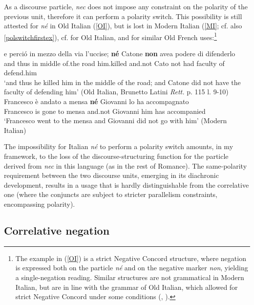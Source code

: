 \documentclass[output=paper,modfonts,nonflat,citecolor=brown,
showindex
]{langsci/langscibook}
\begin{document}
\noindent As a discourse particle, {\emph{nec}} does not impose any constraint on the polarity of the previous unit, therefore it can perform a polarity switch. This possibility is still attested for {\emph{n\'e}} in Old Italian (\ref{OI}), but is lost in Modern Italian (\ref{MI}; cf. also \ref{polswitchfirstex}), cf. \citet{Zanuttini10} for Old Italian, and \citet[]{Doetjes05} for similar Old French uses:{\footnote{The example in (\ref{OI}) is a strict Negative Concord structure, where negation is expressed both on the particle {\emph{n\'e}} and on the negative marker {\emph{non}}, yielding a single-negation reading. Similar structures are not grammatical in Modern Italian, but are in line with the grammar of Old Italian, which allowed for strict Negative Concord under some conditions (\citealt[]{Garzonio18}, \citealt[chapter 5]{Gianollo18}).}} 

{\begin{exe}
\ex
\begin{xlist}
\ex \label{OI} \gll e perci\'o in mezzo della via l'uccise; {\textbf{n\'e}} Catone {\textbf{non}} avea podere di difenderlo\\
and thus in middle of.the road him.killed and.not Cato not had faculty of defend.him\\

`and thus he killed him in the middle of the road; and Catone did not have the faculty of defending him' (Old Italian, Brunetto Latini {\emph{Rett.}} p. 115 l. 9-10) 
\ex \label{MI} \gll *Francesco \`e andato a mensa {\textbf{n\'e}} Giovanni lo ha accompagnato\\
Francesco is gone to mensa and.not Giovanni him has accompanied\\

`Francesco went to the mensa and Giovanni did not go with him' (Modern Italian)
\end{xlist}
\end{exe}}

\noindent The impossibility for Italian {\emph{n\'e}} to perform a polarity switch amounts, in my framework, to the loss of the discourse-structuring function for the particle derived from {\emph{nec}} in this language (as in the rest of Romance). The same-polarity requirement between the two discourse units, emerging in its diachronic development, results in a usage that is hardly distinguishable from the correlative one (where the conjuncts are subject to stricter parallelism constraints, encompassing polarity).  

\subsection{Correlative negation} \label{functioncorrelativeneg}
\end{document}
